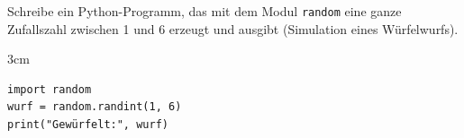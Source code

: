\question[3]
Schreibe ein Python-Programm, das mit dem Modul \texttt{random} eine ganze Zufallszahl
zwischen 1 und 6 erzeugt und ausgibt (Simulation eines Würfelwurfs).

\begin{solutionbox}{3cm}
\begin{lstlisting}
import random
wurf = random.randint(1, 6)
print("Gewürfelt:", wurf)
\end{lstlisting}
\end{solutionbox}